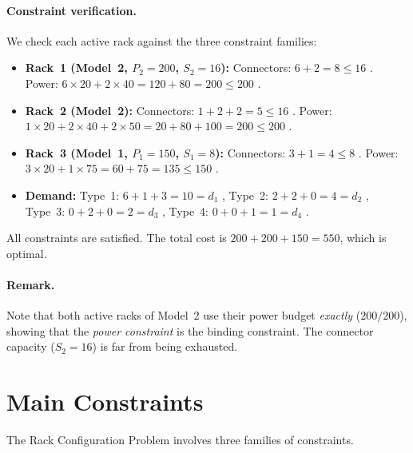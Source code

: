 \documentclass[11pt,a4paper]{article}
\begin{document}
\paragraph{Constraint verification.}
We check each active rack against the three constraint families:
\begin{itemize}
  \item \textbf{Rack~1 (Model~2, $P_2\!=\!200$, $S_2\!=\!16$):}
        Connectors: $6+2 = 8 \le 16$ \checkmark.\quad
        Power: $6 \times 20 + 2 \times 40 = 120 + 80 = 200 \le 200$ \checkmark.
  \item \textbf{Rack~2 (Model~2):}
        Connectors: $1+2+2 = 5 \le 16$ \checkmark.\quad
        Power: $1 \times 20 + 2 \times 40 + 2 \times 50
              = 20 + 80 + 100 = 200 \le 200$ \checkmark.
  \item \textbf{Rack~3 (Model~1, $P_1\!=\!150$, $S_1\!=\!8$):}
        Connectors: $3+1 = 4 \le 8$ \checkmark.\quad
        Power: $3 \times 20 + 1 \times 75 = 60 + 75 = 135 \le 150$ \checkmark.
  \item \textbf{Demand:}
        Type~1: $6+1+3 = 10 = d_1$ \checkmark,\quad
        Type~2: $2+2+0 = 4 = d_2$ \checkmark,\\
        Type~3: $0+2+0 = 2 = d_3$ \checkmark,\quad
        Type~4: $0+0+1 = 1 = d_4$ \checkmark.
\end{itemize}
All constraints are satisfied.
The total cost is $200 + 200 + 150 = 550$, which is optimal.

\paragraph{Remark.}
Note that both active racks of Model~2 use their power budget
\emph{exactly} ($200/200$), showing that the
\emph{power constraint} is the binding constraint.
The connector capacity ($S_2 = 16$) is far from being exhausted.

\section{Main Constraints}
\label{sec:constraints}

The Rack Configuration Problem involves three families of constraints.
\end{document}
